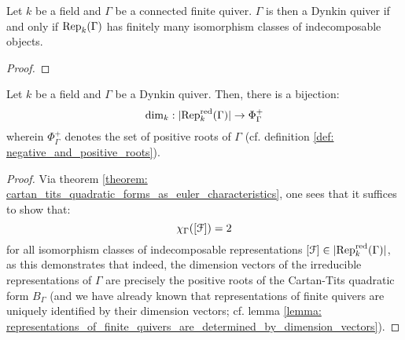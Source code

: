             \begin{theorem} \label{theorem: gabriel_theorem_on_dynkin_quivers}
                Let $k$ be a field and $\Gamma$ be a connected finite quiver. $\Gamma$ is then a Dynkin quiver if and only if $\mathrm{Rep}_k(\Gamma)$ has finitely many isomorphism classes of indecomposable objects.
            \end{theorem}
                \begin{proof}
                    
                \end{proof}
            \begin{corollary} \label{coro: indecomposable_representations_of_finite_quivers_are_labelled_by_positive_roots}
                Let $k$ be a field and $\Gamma$ be a Dynkin quiver. Then, there is a bijection:
                    $$\dim_k: |\mathrm{Rep}_k^{\mathrm{red}}(\Gamma)| \to \Phi_{\Gamma}^+$$
                wherein $\Phi_{\Gamma}^+$ denotes the set of positive roots of $\Gamma$ (cf. definition \ref{def: negative_and_positive_roots}).
            \end{corollary}
                \begin{proof}
                    Via theorem \ref{theorem: cartan_tits_quadratic_forms_as_euler_characteristics}, one sees that it suffices to show that:
                        $$\chi_{\Gamma}([\mathcal{F}]) = 2$$
                    for all isomorphism classes of indecomposable representations $[\mathcal{F}] \in |\mathrm{Rep}_k^{\mathrm{red}}(\Gamma)|$, as this demonstrates that indeed, the dimension vectors of the irreducible representations of $\Gamma$ are precisely the positive roots of the Cartan-Tits quadratic form $B_{\Gamma}$ (and we have already known that representations of finite quivers are uniquely identified by their dimension vectors; cf. lemma \ref{lemma: representations_of_finite_quivers_are_determined_by_dimension_vectors}).
                \end{proof}
                
            \begin{example}
                
            \end{example}
            \begin{example}
                
            \end{example}
            \begin{example}
                
            \end{example}
            \begin{example}
                
            \end{example}
            \begin{example}
                
            \end{example}
        
